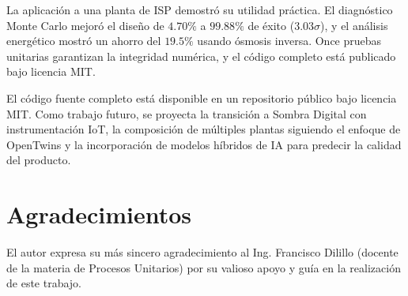 \documentclass[10pt,letterpaper]{article}
\begin{document}
La aplicaci\'on a una planta de ISP demostr\'o su utilidad pr\'actica. El diagn\'ostico Monte Carlo mejor\'o el dise\~no de $4.70\%$ a $99.88\%$ de \'exito ($3.03\sigma$), y el an\'alisis energ\'etico mostr\'o un ahorro del $19.5\%$ usando \'osmosis inversa. Once pruebas unitarias garantizan la integridad num\'erica, y el c\'odigo completo est\'a publicado bajo licencia MIT.

El c\'odigo fuente completo est\'a disponible en un repositorio p\'ublico bajo licencia MIT. Como trabajo futuro, se proyecta la transici\'on a Sombra Digital con instrumentaci\'on IoT, la composici\'on de m\'ultiples plantas siguiendo el enfoque de OpenTwins y la incorporaci\'on de modelos h\'ibridos de IA para predecir la calidad del producto.

\section*{Agradecimientos}

El autor expresa su m\'as sincero agradecimiento al Ing. Francisco Dilillo (docente de la materia de Procesos Unitarios) por su valioso apoyo y gu\'ia en la realizaci\'on de este trabajo.
\end{document}
